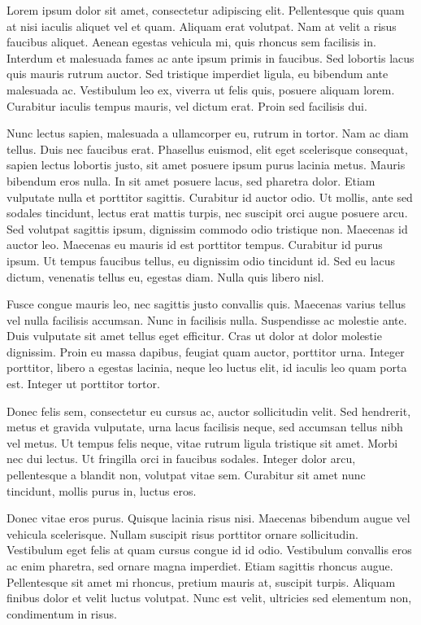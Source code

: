 \documentclass{./styles/UoYCSproject}
\begin{document}
Lorem ipsum dolor sit amet, consectetur adipiscing elit. Pellentesque quis quam at nisi iaculis aliquet vel et quam. Aliquam erat volutpat. Nam at velit a risus faucibus aliquet. Aenean egestas vehicula mi, quis rhoncus sem facilisis in. Interdum et malesuada fames ac ante ipsum primis in faucibus. Sed lobortis lacus quis mauris rutrum auctor. Sed tristique imperdiet ligula, eu bibendum ante malesuada ac. Vestibulum leo ex, viverra ut felis quis, posuere aliquam lorem. Curabitur iaculis tempus mauris, vel dictum erat. Proin sed facilisis dui.

Nunc lectus sapien, malesuada a ullamcorper eu, rutrum in tortor. Nam ac diam tellus. Duis nec faucibus erat. Phasellus euismod, elit eget scelerisque consequat, sapien lectus lobortis justo, sit amet posuere ipsum purus lacinia metus. Mauris bibendum eros nulla. In sit amet posuere lacus, sed pharetra dolor. Etiam vulputate nulla et porttitor sagittis. Curabitur id auctor odio. Ut mollis, ante sed sodales tincidunt, lectus erat mattis turpis, nec suscipit orci augue posuere arcu. Sed volutpat sagittis ipsum, dignissim commodo odio tristique non. Maecenas id auctor leo. Maecenas eu mauris id est porttitor tempus. Curabitur id purus ipsum. Ut tempus faucibus tellus, eu dignissim odio tincidunt id. Sed eu lacus dictum, venenatis tellus eu, egestas diam. Nulla quis libero nisl.

Fusce congue mauris leo, nec sagittis justo convallis quis. Maecenas varius tellus vel nulla facilisis accumsan. Nunc in facilisis nulla. Suspendisse ac molestie ante. Duis vulputate sit amet tellus eget efficitur. Cras ut dolor at dolor molestie dignissim. Proin eu massa dapibus, feugiat quam auctor, porttitor urna. Integer porttitor, libero a egestas lacinia, neque leo luctus elit, id iaculis leo quam porta est. Integer ut porttitor tortor.

Donec felis sem, consectetur eu cursus ac, auctor sollicitudin velit. Sed hendrerit, metus et gravida vulputate, urna lacus facilisis neque, sed accumsan tellus nibh vel metus. Ut tempus felis neque, vitae rutrum ligula tristique sit amet. Morbi nec dui lectus. Ut fringilla orci in faucibus sodales. Integer dolor arcu, pellentesque a blandit non, volutpat vitae sem. Curabitur sit amet nunc tincidunt, mollis purus in, luctus eros.

Donec vitae eros purus. Quisque lacinia risus nisi. Maecenas bibendum augue vel vehicula scelerisque. Nullam suscipit risus porttitor ornare sollicitudin. Vestibulum eget felis at quam cursus congue id id odio. Vestibulum convallis eros ac enim pharetra, sed ornare magna imperdiet. Etiam sagittis rhoncus augue. Pellentesque sit amet mi rhoncus, pretium mauris at, suscipit turpis. Aliquam finibus dolor et velit luctus volutpat. Nunc est velit, ultricies sed elementum non, condimentum in risus.
\end{document}

